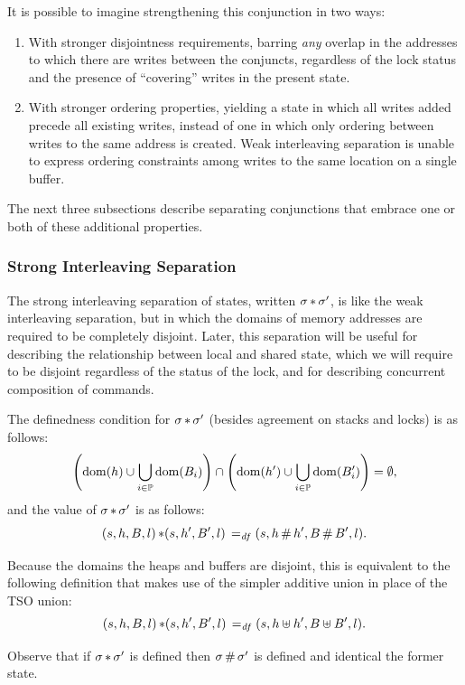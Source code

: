 \documentclass[11pt]{report}
\begin{document}
It is possible to imagine strengthening this conjunction in two ways: \begin{enumerate}
	\item With stronger disjointness requirements, barring \emph{any} overlap in the addresses to which there are writes between the conjuncts, regardless of the lock status and the presence of ``covering'' writes in the present state.  
	
	\item With stronger ordering properties, yielding a state in which all writes added precede all existing writes, instead of one in which only ordering between writes to the same address is created. Weak interleaving separation is unable to express ordering constraints among writes to the same location on a single buffer. 
\end{enumerate}

The next three subsections describe separating conjunctions that embrace one or both of these additional properties. 

\subsubsection{Strong Interleaving Separation}

The strong interleaving separation of states, written $\sigma \operatorname{\ast} \sigma'$, is like the weak interleaving separation, but in which the domains of memory addresses are required to be completely disjoint. Later, this separation will be useful for describing the relationship between local and shared state, which we will require to be disjoint regardless of the status of the lock, and for describing concurrent composition of commands.

 The definedness condition for $\sigma \operatorname{\ast} \sigma'$ (besides agreement on stacks and locks) is as follows: \[ \left(\operatorname{\mathrm{dom}}(h) \cup \bigcup_{i \in \mathbb{P}} \operatorname{\mathrm{dom}}(B_i) \right) \cap \left( \operatorname{\mathrm{dom}}(h') \cup \bigcup_{i \in \mathbb{P}} \operatorname{\mathrm{dom}}(B'_i)\right) = \operatorname{\emptyset}, \] and the value of $\sigma \operatorname{\ast} \sigma'$ is as follows: \[ (s,h,B,l) \operatorname{\ast} (s,h',B',l) \operatorname{\;=_{\mathit{df}}\;} (s,h\operatorname{\#} h',B\operatorname{\#} B',l).\] 

Because the domains the heaps and buffers are disjoint, this is equivalent to the following definition that makes use of the simpler additive union in place of the TSO union: \[ (s,h,B,l) \operatorname{\ast} (s,h',B',l) \operatorname{\;=_{\mathit{df}}\;} (s,h\uplus h',B\uplus B',l).\] 

Observe that if $\sigma \operatorname{\ast} \sigma'$ is defined then $\sigma \operatorname{\#} \sigma'$ is defined and identical the former state. 
\end{document}
